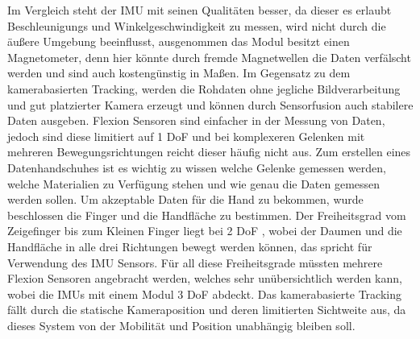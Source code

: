 Im Vergleich steht der IMU mit seinen Qualitäten besser, da dieser es erlaubt Beschleunigungs und Winkelgeschwindigkeit zu messen, wird nicht durch die äußere Umgebung beeinflusst, ausgenommen das Modul besitzt einen Magnetometer, denn hier könnte durch fremde Magnetwellen die Daten verfälscht werden und sind auch kostengünstig in Maßen. Im Gegensatz zu dem kamerabasierten Tracking, werden die Rohdaten ohne jegliche Bildverarbeitung und gut platzierter Kamera erzeugt und können durch Sensorfusion auch stabilere Daten ausgeben. Flexion Sensoren sind einfacher in der Messung von Daten, jedoch sind diese limitiert auf 1 DoF und bei komplexeren Gelenken mit mehreren Bewegungsrichtungen reicht dieser häufig nicht aus. Zum erstellen eines Datenhandschuhes ist es wichtig zu wissen welche Gelenke gemessen werden, welche Materialien zu Verfügung stehen und wie genau die Daten gemessen werden sollen. Um akzeptable Daten für die Hand zu bekommen, wurde beschlossen die Finger und die Handfläche zu bestimmen. Der Freiheitsgrad vom Zeigefinger bis zum Kleinen Finger liegt bei 2 DoF \parencite{gloveBasedSystems}, wobei der Daumen und die Handfläche in alle drei Richtungen bewegt werden können, das spricht für Verwendung des IMU Sensors. Für all diese Freiheitsgrade müssten mehrere Flexion Sensoren angebracht werden, welches sehr unübersichtlich werden kann, wobei die IMUs mit einem Modul 3 DoF abdeckt. Das kamerabasierte Tracking fällt durch die statische Kameraposition und deren limitierten Sichtweite aus, da dieses System von der Mobilität und Position unabhängig bleiben soll.\parencite{Wokke}


